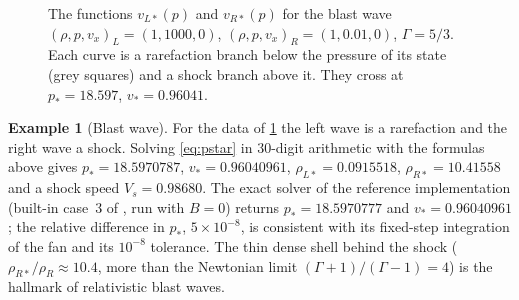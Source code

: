 \documentclass[11pt,a4paper,oneside,openany]{book}
\theoremstyle{definition}
\newtheorem{example}{Example}[chapter]
\theoremstyle{plain}
\theoremstyle{remark}
\newcommand{\file}[1]{\texttt{\detokenize{#1}}}
\begin{document}
\begin{figure}[t]
\caption{The functions $v_{L\ast}(p)$ and $v_{R\ast}(p)$ for the blast wave
$(\rho,p,v_x)_L=(1,1000,0)$, $(\rho,p,v_x)_R=(1,0.01,0)$, $\Gamma=5/3$. Each curve is a
rarefaction branch below the pressure of its state (grey squares) and a shock branch above
it. They cross at $p_\ast=18.597$, $v_\ast=0.96041$.}
\label{fig:hydro-pstar}
\end{figure}

\begin{example}[Blast wave]\label{ex:blast}
For the data of \cref{fig:hydro-pstar} the left wave is a rarefaction and the right wave a
shock. Solving \eqref{eq:pstar} in 30-digit arithmetic with the formulas above gives
$p_\ast=18.5970787$, $v_\ast=0.96040961$, $\rho_{L\ast}=0.0915518$,
$\rho_{R\ast}=10.41558$ and a shock speed $V_s=0.98680$. The exact solver of the reference
implementation (built-in case~3 of \file{rmhd/initial_data.py}, run with $B=0$) returns
$p_\ast=18.5970777$ and $v_\ast=0.96040961$; the relative difference in $p_\ast$,
$5\times10^{-8}$, is consistent with its fixed-step integration of the fan and its
$10^{-8}$ tolerance. The thin dense shell behind the shock ($\rho_{R\ast}/\rho_R\approx10.4$,
more than the Newtonian limit $(\Gamma+1)/(\Gamma-1)=4$) is the hallmark of relativistic
blast waves.
\end{example}
\end{document}
